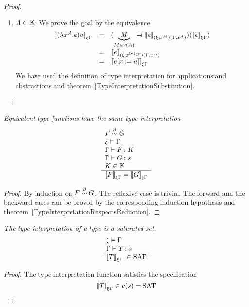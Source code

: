 \begin{theorem}
\begin{proof}
\begin{enumerate}
        \item $A \in \mathbb{K}$: We prove the goal by the equivalence
            $$
            \begin{array}{lll}
                \typeinter{(\lambda x^A.e)a}{\xi\Gamma}
                &=&
                (
                    \underbrace M_{M \in \nu(A)}
                    \mapsto
                    \typeinter{e}{(\xi,x^M)(\Gamma,x^A)}
                )
                (
                    \typeinter{a}{\xi\Gamma}
                )
                \\
                &=&
                \typeinter
                {e}
                {(\xi,x^{\typeinter{a}{\xi\Gamma}})(\Gamma,x^A)}
                \\
                &=&
                \typeinter{e[x:=a]}{\xi\Gamma}
            \end{array}
            $$
            We have used the definition of type interpretation for applications and
                abstractions and
                theorem~\ref{TypeInterpretationSubstitution}.
        \end{enumerate}
    \end{proof}
\end{theorem}





\begin{theorem}
    \label{TypeInterpretationEquivalence}
    \emph{Equivalent type functions have the same type interpretation}
    $$
    \begin{array}{l} 
        F \stackrel{\beta}{\sim} G
        \\
        \xi \vDash \Gamma
        \\
        \Gamma \vdash F : K
        \\
        \Gamma \vdash G : s
        \\
        K \in \mathbb{K}
     \\ \hline 
        {{{[\![}F {]\!]}}_{\xi\Gamma}} = {{{[\![} G {]\!]}}_{\xi\Gamma}}
    \end{array}
    $$
    \begin{proof} By induction on $F \stackrel{\beta}{\sim} G$. The reflexive case is trivial.
        The forward and the backward cases can be proved by the corresponding
        induction hypothesis and
        theorem~\ref{TypeInterpretationRespectsReduction}.
    \end{proof}
\end{theorem}


\begin{theorem}
    \label{TypeInterpretationTypeSaturated}
    \emph{The type interpretation of a type is a saturated set}.
    $$
    \rulev{
        \xi \vDash \Gamma
        \\
        \Gamma \vdash T : s
    }
    {
        \typeinter{T}{\xi\Gamma} \in \SAT
    }
    $$
    \begin{proof}
        The type interpretation function satisfies the specification
        $$
        {{{[\![} T {]\!]}}_{\xi\Gamma}} \in \nu(s) = \text{SAT}
        $$
    \end{proof}
\end{theorem}







